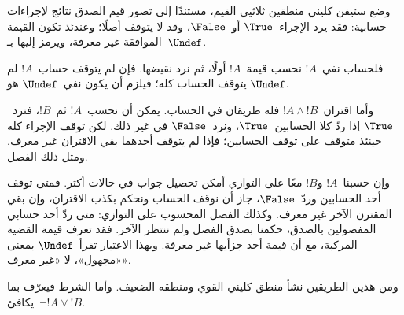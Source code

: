 \documentclass[../../../include/open-logic-section]{subfiles}
\begin{document}


وضع ستيفن كليني منطقين ثلاثيي القيم، مستندًا إلى تصور قيم الصدق
نتائج لإجراءات حسابية: فقد يرد الإجراء~$\True$ أو~$\False$، وقد لا
يتوقف أصلًا؛ وعندئذ تكون القيمة الموافقة غير معرفة، ويرمز إليها
بـ~$\Undef$.

فلحساب نفي~$!A$ نحسب قيمة~$!A$ أولًا، ثم نرد نقيضها. فإن لم يتوقف
حساب~$!A$ لم يتوقف الحساب كله؛ فيلزم أن يكون نفي~$\Undef$ هو
$\Undef$.

وأما اقتران~$!A \land !B$ فله طريقان في الحساب. يمكن أن نحسب~$!A$
ثم~$!B$، فنرد~$\True$ إذا ردّ كلا الحسابين~$\True$، ونرد~$\False$
في غير ذلك. لكن توقف الإجراء كله حينئذ متوقف على توقف الحسابين؛ فإذا
لم يتوقف أحدهما بقي الاقتران غير معرف. ومثل ذلك الفصل.

وإن حسبنا~$!A$ و$!B$ معًا على التوازي أمكن تحصيل جواب في حالات أكثر.
فمتى توقف أحد الحسابين وردّ~$\False$، جاز أن نوقف الحساب ونحكم بكذب
الاقتران، وإن بقي المقترن الآخر غير معرف. وكذلك الفصل المحسوب على
التوازي: متى ردّ أحد حسابي المفصولين بالصدق، حكمنا بصدق الفصل ولم
ننتظر الآخر. فقد تعرف قيمة القضية المركبة، مع أن قيمة أحد جزأيها
غير معرفة. وبهذا الاعتبار تقرأ~$\Undef$ بمعنى «مجهول»، لا «غير معرف».

ومن هذين الطريقين نشأ منطق كليني القوي ومنطقه الضعيف. وأما الشرط
فيعرّف بما يكافئ~$\lnot !A \lor !B$.
\end{document}
